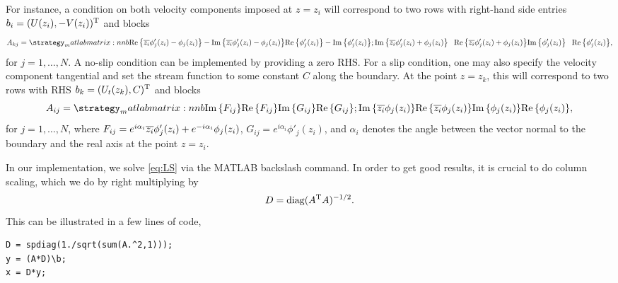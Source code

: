 For instance, a condition on both velocity components imposed at $z=z_i$ will correspond to two rows with right-hand side entries $b_i=(U(z_i), -V(z_i))^{\text{T}}$ and blocks
\begin{equation}
\renewcommand*{\arraystretch}{1.5}
A_{kj}=\matlabmatrix{\real{\conj{z_i}\phi'_j(z_i)-\phi_j(z_i)} -\imag{\conj{z_i}\phi'_j(z_i)-\phi_j(z_i)} \real{\phi'_j(z_i)} -\imag{\phi'_j(z_i)}; 
\imag{\conj{z_i}\phi'_j(z_i)+\phi_j(z_i)} \phantom{+}\real{\conj{z_i}\phi'_j(z_i)+\phi_j(z_i)} \imag{\phi'_j(z_i)} \phantom{+}\real{\phi'_j(z_i)}},
\end{equation}
for $j=1,\ldots,N$. A no-slip condition can be implemented by providing a zero RHS.
For a slip condition, one may also specify the velocity component tangential and set the stream function to some constant $C$ along the boundary. At the point $z=z_k$, this will correspond to two rows with RHS $b_k=(U_t(z_k),C)^{\text{T}}$ and blocks
\begin{equation}
\renewcommand*{\arraystretch}{1.5}
A_{ij}=\matlabmatrix{\imag{F_{ij}} \real{F_{ij}} \imag{G_{ij}} \real{G_{ij}}; 
\imag{\conj{z_i}\phi_j(z_i)} \real{\conj{z_i}\phi_j(z_i)} \imag{\phi_j(z_i)} \real{\phi_j(z_i)}},
\end{equation}
for $j=1,\ldots,N$, where $F_{ij}=e^{i\alpha_i}{\overline{z_i}}\phi'_j(z_i)+e^{-i\alpha_i}\phi_j(z_i)$,  $G_{ij}=e^{i\alpha_i}\phi'_j(z_i)$, and $\alpha_i$ denotes the angle between the vector normal to the boundary and the real axis at the point $z=z_i$.

In our implementation, we solve \eqref{eq:LS} via the MATLAB backslash command. In order to get good results, it is crucial to do column scaling, which we do by right multiplying by
\begin{equation}
D=\operatorname{diag}( A^{\text{T}} A)^{-1/2}.
\end{equation} 
This can be illustrated in a few lines of code,
\begin{verbatim}
D = spdiag(1./sqrt(sum(A.^2,1)));
y = (A*D)\b; 
x = D*y;
\end{verbatim}


